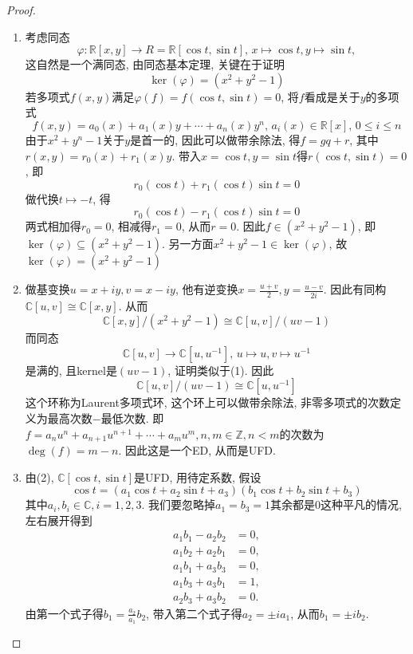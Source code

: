 \documentclass{../solutions-cn}
\begin{document}
\begin{proof}
    \begin{enumerate}[(1)]
        \item 考虑同态
        \[
            \varphi: \mathbb{R}[x, y] \to R = \mathbb{R}[\cos t, \sin t],\, x \mapsto \cos t, y \mapsto \sin t,
        \]
        这自然是一个满同态, 由同态基本定理, 关键在于证明
        \[
            \ker(\varphi) = (x^2 + y^2 - 1)
        \]
        若多项式$f(x, y)$满足$\varphi(f) = f(\cos t, \sin t) = 0$, 将$f$看成是关于$y$的多项式
        \[
            f(x, y) = a_0(x) + a_1(x)y + \cdots + a_n(x)y^n,\, a_i(x) \in \mathbb{R}[x],\, 0 \leqslant i \leqslant n
        \]
        由于$x^2 + y^n - 1$关于$y$是首一的, 因此可以做带余除法, 得$f = gq + r$, 其中$r(x, y) = r_0(x) + r_1(x)y$. 带入$x = \cos t, y = \sin t$得$r(\cos t, \sin t) = 0$, 即
        \[
            r_0(\cos t) + r_1(\cos t)\sin t = 0
        \]
        做代换$t \mapsto -t$, 得
        \[
            r_0(\cos t) - r_1(\cos t)\sin t = 0
        \]
        两式相加得$r_0 = 0$, 相减得$r_1 = 0$, 从而$r = 0$. 因此$f \in (x^2 + y^2 - 1)$, 即$\ker(\varphi) \subseteq (x^2 + y^2 - 1)$. 另一方面$x^2 + y^2 - 1 \in \ker(\varphi)$, 故$\ker(\varphi) = (x^2 + y^2 - 1)$
        \item 做基变换$u = x + iy, v = x - iy$, 他有逆变换$x = \frac{u + v}{2}, y = \frac{u - v}{2i}$. 因此有同构$\mathbb{C}[u, v] \cong \mathbb{C}[x, y]$. 从而
        \[
            \mathbb{C}[x, y]/(x^2 + y^2 - 1) \cong \mathbb{C}[u, v]/(uv - 1)
        \]
        而同态
        \[
            \mathbb{C}[u, v] \to \mathbb{C}[u, u^{-1}],\, u \mapsto u, v \mapsto u^{-1}
        \]
        是满的, 且kernel是$(uv - 1)$, 证明类似于(1). 因此
        \[
            \mathbb{C}[u, v]/(uv - 1) \cong \mathbb{C}[u, u^{-1}]
        \]
        这个环称为Laurent多项式环, 这个环上可以做带余除法, 非零多项式的次数定义为最高次数$-$最低次数. 即$f = a_nu^n + a_{n + 1}u^{n + 1} + \cdots + a_mu^m, n, m \in \mathbb{Z}, n < m$的次数为$\deg(f) = m - n$. 因此这是一个ED, 从而是UFD.
        \item 由(2), $\mathbb{C}[\cos t, \sin t]$是UFD, 用待定系数, 假设
        \[
            \cos t = (a_1\cos t + a_2\sin t + a_3)(b_1\cos t + b_2\sin t + b_3)
        \]
        其中$a_i, b_i \in \mathbb{C}, i = 1, 2, 3$. 我们要忽略掉$a_1 = b_3 = 1$其余都是$0$这种平凡的情况, 左右展开得到
        \[
        \begin{aligned}
            a_1b_1 - a_2b_2 &= 0,\\
            a_1b_2 + a_2b_1 &= 0,\\
            a_1b_1 + a_3b_3 &= 0,\\
            a_1b_3 + a_3b_1 &= 1,\\
            a_2b_3 + a_3b_2 &= 0.
        \end{aligned}
        \]
        由第一个式子得$b_1 = \frac{a_2}{a_1}b_2$, 带入第二个式子得$a_2 = \pm ia_1$, 从而$b_1 = \pm ib_2$.
    

\end{enumerate}
\end{proof}
\end{document}
